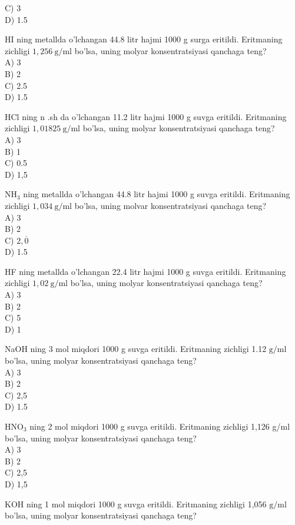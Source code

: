 C) 3\\
D) 1.5
  \item HI ning metallda o'lchangan 44.8 litr hajmi 1000 g surga eritildi. Eritmaning zichligi $1,256 \mathrm{~g} / \mathrm{ml}$ bo'lsa, uning molyar konsentratsiyasi qanchaga teng?\\
A) 3\\
B) 2\\
C) 2.5\\
D) 1.5
  \item HCl ning n .sh da o'lchangan 11.2 litr hajmi 1000 g suvga eritildi. Eritmaning zichligi $1,01825 \mathrm{~g} / \mathrm{ml}$ bo'lsa, uning molyar konsentratsiyasi qanchaga teng?\\
A) 3\\
B) 1\\
C) 0.5\\
D) 1,5
  \item $\mathrm{NH}_{3}$ ning metallda o'lchangan 44.8 litr hajmi 1000 g suvga eritildi. Eritmaning zichligi $1,034 \mathrm{~g} / \mathrm{ml}$ bo'lsa, uning molvar konsentratsiyasi qanchaga teng?\\
A) 3\\
B) 2\\
C) $2, \overline{0}$\\
D) 1.5
  \item HF ning metallda o'lchangan 22.4 litr hajmi 1000 g suvga eritildi. Eritmaning zichligi $1,02 \mathrm{~g} / \mathrm{ml}$ bo'lsa, uning molyar konsentratsiyasi qanchaga teng?\\
A) 3\\
B) 2\\
C) 5\\
D) 1
  \item NaOH ning 3 mol miqdori 1000 g suvga eritildi. Eritmaning zichligi 1.12 $\mathrm{g} / \mathrm{ml}$ bo'lsa, uning molyar konsentratsiyasi qanchaga teng?\\
A) 3\\
B) 2\\
C) 2,5\\
D) 1.5\\
  \item $\mathrm{HNO}_{3}$ ning 2 mol miqdori 1000 g suvga eritildi. Eritmaning zichligi 1,126 g/ml bo'lsa, uning molyar konsentratsiyasi qanchaga teng?\\
A) 3\\
B) 2\\
C) 2,5\\
D) 1,5
  \item KOH ning 1 mol miqdori 1000 g suvga eritildi. Eritmaning zichligi 1,056 $\mathrm{g} / \mathrm{ml}$ bo'lsa, uning molyar konsentratsiyasi qanchaga teng?\\
